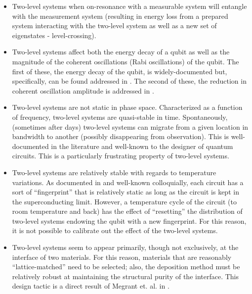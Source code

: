 \documentclass[aps,prl,reprint,groupedaddress]{revtex4-1}
\begin{document}
\begin{itemize}
	\item Two-level systems when on-resonance with a measurable system will entangle with the measurement system (resulting in energy loss from a prepared system interacting with the two-level system as well as a new set of eigenstates - level-crossing).
	\item Two-level systems affect both the energy decay of a qubit as well as the magnitude of the coherent oscillations (Rabi oscillations) of the qubit. The first of these, the energy decay of the qubit, is widely-documented but, specifically, can be found addressed in \cite{martinis_decoherence_2005}. The second of these, the reduction in coherent oscillation amplitude is addressed in \cite{simmonds_decoherence_2004}. 
	\item Two-level systems are not static in phase space. Characterized as a function of frequency, two-level systems are quasi-stable in time. Spontaneously, (sometimes after days) two-level systems can migrate from a given location in bandwidth to another (possibly disappearing from observation). This is well-documented in the literature and well-known to the designer of quantum circuits. This is a particularly frustrating property of two-level systems.
	\item Two-level systems are relatively stable with regards to temperature variations. As documented in \cite{simmonds_decoherence_2004} and well-known colloquially, each circuit has a sort of ``fingerprint'' that is relatively static as long as the circuit is kept in the superconducting limit. However, a temperature cycle of the circuit (to room temperature and back) has the effect of ``resetting'' the distribution of two-level systems endowing the qubit with a new fingerprint. For this reason, it is not possible to calibrate out the effect of the two-level systems.
	\item Two-level systems seem to appear primarily, though not exclusively, at the interface of two materials. For this reason, materials that are reasonably ``lattice-matched'' need to be selected; also, the deposition method must be relatively robust at maintaining the structural purity of the interface. This design tactic is a direct result of Megrant et. al. in \cite{megrant_planar_2012}.
	\end{itemize}
\end{document}

